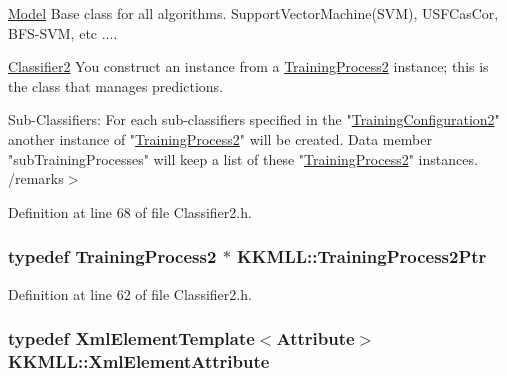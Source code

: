 \hyperlink{class_k_k_m_l_l_1_1_model}{Model} Base class for all algorithms. Support\+Vector\+Machine(\+S\+V\+M), U\+S\+F\+Cas\+Cor, B\+F\+S-\/\+S\+VM, etc ....


\begin{DoxyItemize}
\item \hyperlink{class_k_k_m_l_l_1_1_classifier2}{Classifier2} You construct an instance from a \textquotesingle{}\hyperlink{class_k_k_m_l_l_1_1_training_process2}{Training\+Process2}\textquotesingle{} instance; this is the class that manages predictions.

Sub-\/\+Classifiers\+: For each sub-\/classifiers specified in the "\hyperlink{class_k_k_m_l_l_1_1_training_configuration2}{Training\+Configuration2}" another instance of "\hyperlink{class_k_k_m_l_l_1_1_training_process2}{Training\+Process2}" will be created. Data member "sub\+Training\+Processes" will keep a list of these "\hyperlink{class_k_k_m_l_l_1_1_training_process2}{Training\+Process2}" instances. /remarks$>$ 
\end{DoxyItemize}

Definition at line 68 of file Classifier2.\+h.

\subsubsection[{\texorpdfstring{Training\+Process2\+Ptr}{TrainingProcess2Ptr}}]{\setlength{\rightskip}{0pt plus 5cm}typedef {\bf Training\+Process2} $\ast$ {\bf K\+K\+M\+L\+L\+::\+Training\+Process2\+Ptr}}\hypertarget{namespace_k_k_m_l_l_a1fd087a9fde5db46fe14f6e98f994a71}{}\label{namespace_k_k_m_l_l_a1fd087a9fde5db46fe14f6e98f994a71}


Definition at line 62 of file Classifier2.\+h.

\subsubsection[{\texorpdfstring{Xml\+Element\+Attribute}{XmlElementAttribute}}]{\setlength{\rightskip}{0pt plus 5cm}typedef {\bf Xml\+Element\+Template}$<${\bf Attribute}$>$ {\bf K\+K\+M\+L\+L\+::\+Xml\+Element\+Attribute}}\hypertarget{namespace_k_k_m_l_l_aed7d3fc29995cb426aaf9f5623100008}{}\label{namespace_k_k_m_l_l_aed7d3fc29995cb426aaf9f5623100008}


